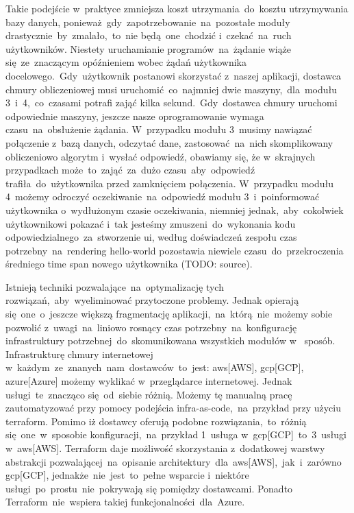 Takie podejście w~praktyce zmniejsza koszt utrzymania~do~kosztu utrzymywania bazy danych, ponieważ~gdy~zapotrzebowanie~na~pozostałe moduły drastycznie~by~zmalało,~to~nie będą~one~chodzić i~czekać~na~ruch użytkowników.
Niestety uruchamianie programów~na~żądanie wiąże się~ze~znaczącym opóźnieniem wobec żądań użytkownika docelowego.~Gdy~użytkownik postanowi skorzystać z~naszej aplikacji, dostawca chmury obliczeniowej musi uruchomić~co~najmniej dwie maszyny,~dla~modułu 3~i~4,~co~czasami potrafi zająć kilka sekund.~Gdy~dostawca chmury uruchomi odpowiednie maszyny, jeszcze nasze oprogramowanie wymaga czasu~na~obsłużenie żądania.
W~przypadku modułu 3~musimy nawiązać połączenie z~bazą danych, odczytać dane, zastosować~na~nich skomplikowany obliczeniowo algorytm i~wysłać odpowiedź, obawiamy się, że w~skrajnych przypadkach może~to~zająć~za~dużo czasu~aby~odpowiedź trafiła~do~użytkownika przed zamknięciem połączenia.
W~przypadku modułu 4~możemy odroczyć oczekiwanie~na~odpowiedź modułu 3~i~poinformować użytkownika o~wydłużonym czasie oczekiwania, niemniej jednak,~aby~cokolwiek użytkownikowi pokazać i~tak jesteśmy zmuszeni~do~wykonania kodu odpowiedzialnego~za~stworzenie \gls{ui}, według doświadczeń zespołu czas potrzebny~na~\gls{rendering} \gls{hello-world} pozostawia niewiele czasu~do~przekroczenia średniego time span nowego użytkownika (TODO: source).

Istnieją techniki pozwalające~na~optymalizację tych rozwiązań,~aby~wyeliminować przytoczone problemy.
Jednak opierają się~one~o~jeszcze większą fragmentację aplikacji,~na~którą~nie~możemy sobie pozwolić z~uwagi~na~liniowo rosnący czas potrzebny~na~konfigurację infrastruktury potrzebnej~do~skomunikowana wszystkich modułów w~ sposób.
Infrastrukturę chmury internetowej w~każdym~ze~znanych~nam~dostawców~to~jest: \acrshort{aws}[AWS], \acrshort{gcp}[GCP], \acrshort{azure}[Azure] możemy wyklikać w~przeglądarce internetowej.
Jednak usługi~te~znacząco się~od~siebie różnią.
Możemy tę manualną pracę zautomatyzować przy pomocy podejścia \gls{infra-as-code},~na~przykład przy użyciu terraform.
Pomimo iż dostawcy oferują podobne rozwiązania,~to~różnią się~one~w~sposobie konfiguracji,~na~przykład 1~usługa w~\acrshort{gcp}[GCP]~to~3~usługi w~\acrshort{aws}[AWS]\@.
Terraform daje możliwość skorzystania z~dodatkowej warstwy abstrakcji pozwalającej~na~opisanie architektury~dla~\acrshort{aws}[AWS],~jak~i~zarówno \acrshort{gcp}[GCP], jednakże~nie~jest~to~pełne wsparcie i~niektóre usługi~po~prostu~nie~pokrywają się pomiędzy dostawcami.
Ponadto Terraform~nie~wspiera takiej funkcjonalności~dla~Azure.

